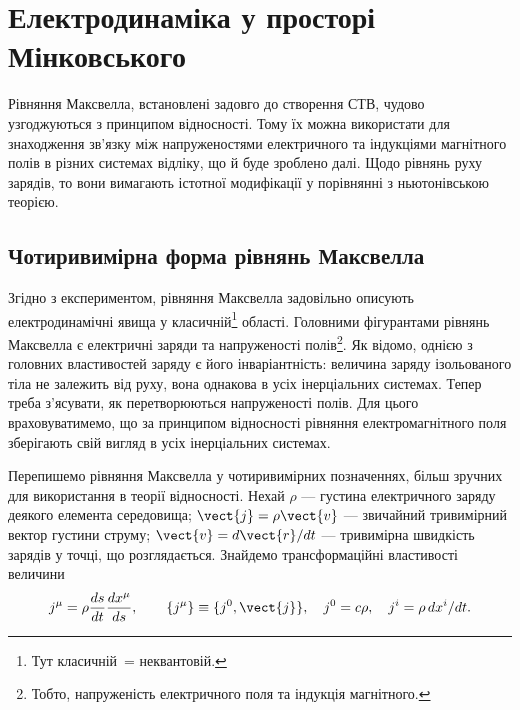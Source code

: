 

\chapter{Електродинаміка у просторі Мінковського}\label{\currfilebase}

Рівняння Максвелла, встановлені задовго до створення СТВ, чудово узгоджуються з принципом відносності. Тому їх можна використати для знаходження зв'язку між напруженостями електричного та індукціями магнітного полів в різних системах відліку, що й буде зроблено далі. Щодо рівнянь руху зарядів, то вони вимагають істотної модифікації у порівнянні з ньютонівською теорією.

\section{Чотиривимірна форма рівнянь Максвелла}

Згідно з експериментом, рівняння Максвелла задовільно описують електродинамічні явища у класичній\footnote{Тут класичній~= неквантовій.} області. Головними фігурантами рівнянь Максвелла є електричні заряди та напруженості полів\footnote{Тобто, напруженість електричного поля та індукція магнітного.}. Як відомо, однією з головних властивостей заряду є його інваріантність: величина заряду ізольованого тіла не залежить від руху, вона однакова в усіх інерціальних системах. Тепер треба з'ясувати, як перетворюються напруженості полів. Для цього враховуватимемо, що за принципом відносності рівняння електромагнітного поля зберігають свій вигляд в усіх інерціальних системах.

Перепишемо рівняння Максвелла у чотиривимірних позначеннях, більш зручних для використання в теорії відносності. Нехай $\rho$ --- густина електричного заряду деякого елемента середовища; $\vect{j}=\rho\vect{v}$ --- звичайний тривимірний вектор густини струму; $\vect{v}=d\vect{r}/dt$ --- тривимірна швидкість зарядів у точці, що розглядається. Знайдемо трансформаційні властивості величини
\begin{equation*}
    j^{\mu} = \rho\frac{ds}{dt}\frac{dx^{\mu}}{ds},
    \qquad
    \{j^{\mu}\} \equiv \{j^{0},\vect{j}\},\quad
    j^{0} = c\rho,\quad
    j^{i} = \rho\,dx^{i}/dt.
\end{equation*}

